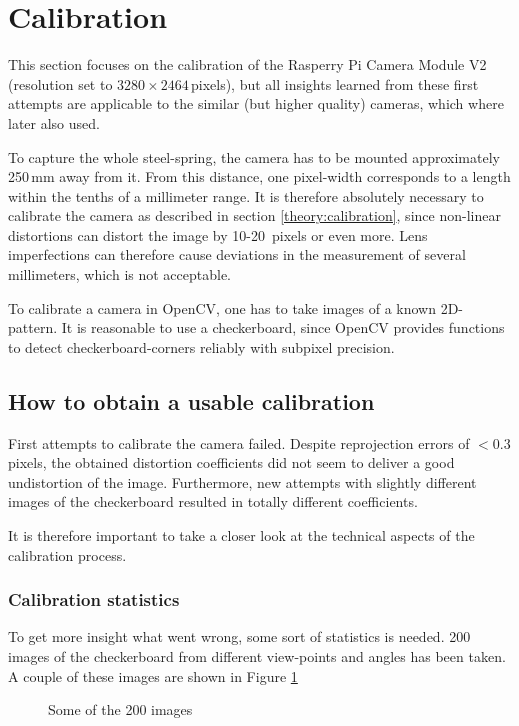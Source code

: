 \section{Calibration}
This section focuses on the calibration of the Rasperry Pi Camera Module V2 (resolution set to $3280\times 2464$\,pixels),
but all insights learned from these first attempts are applicable to the similar (but higher quality) cameras, which where later also used.

To capture the whole steel-spring, the camera has to be mounted approximately 250\,mm away from it.
From this distance, one pixel-width corresponds to a length within the tenths of a millimeter range.
It is therefore absolutely necessary to calibrate the camera as described in section \ref{theory:calibration}, since non-linear distortions can distort the image by 10-20\, pixels or even more.
Lens imperfections can therefore cause deviations in the measurement of several millimeters, which is not acceptable.

To calibrate a camera in OpenCV, one has to take images of a known 2D-pattern.
It is reasonable to use a checkerboard, since OpenCV provides functions to detect checkerboard-corners reliably with subpixel precision.

\subsection{How to obtain a usable calibration}
First attempts to calibrate the camera failed.
Despite reprojection errors of $<0.3$ pixels, the obtained distortion coefficients did not seem to deliver a good undistortion of the image.
Furthermore, new attempts with slightly different images of the checkerboard resulted in totally different coefficients.

It is therefore important to take a closer look at the technical aspects of the calibration process.

\subsubsection{Calibration statistics}
To get more insight what went wrong, some sort of statistics is needed.
200 images of the checkerboard from different view-points and angles has been taken.
A couple of these images are shown in Figure  \ref{development:im}

\begin{figure}[ht]
	\centering
	
	\caption{Some of the 200 images \label{development:im}}		
\end{figure}

